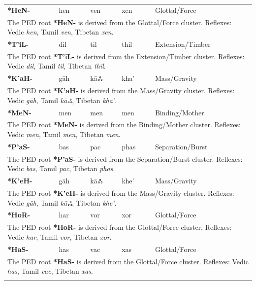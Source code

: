 \begin{longtable}{p{} p{} p{} p{} p{}}
\textbf{*HeN-} & hen & ven & xen & Glottal/Force \\ 
\multicolumn{5}{p{\textwidth}}{\small The PED root \textbf{*HeN-} is derived from the Glottal/Force cluster. Reflexes: Vedic \textit{hen}, Tamil \textit{ven}, Tibetan \textit{xen}. } \\ \addlinespace 
\textbf{*T'iL-} & dil & til & thil & Extension/Timber \\ 
\multicolumn{5}{p{\textwidth}}{\small The PED root \textbf{*T'iL-} is derived from the Extension/Timber cluster. Reflexes: Vedic \textit{dil}, Tamil \textit{til}, Tibetan \textit{thil}. } \\ \addlinespace 
\textbf{*K'aH-} & gāh & kāஃ & kha' & Mass/Gravity \\ 
\multicolumn{5}{p{\textwidth}}{\small The PED root \textbf{*K'aH-} is derived from the Mass/Gravity cluster. Reflexes: Vedic \textit{gāh}, Tamil \textit{kāஃ}, Tibetan \textit{kha'}. } \\ \addlinespace 
\textbf{*MeN-} & men & men & men & Binding/Mother \\ 
\multicolumn{5}{p{\textwidth}}{\small The PED root \textbf{*MeN-} is derived from the Binding/Mother cluster. Reflexes: Vedic \textit{men}, Tamil \textit{men}, Tibetan \textit{men}. } \\ \addlinespace 
\textbf{*P'aS-} & bas & pac & phas & Separation/Burst \\ 
\multicolumn{5}{p{\textwidth}}{\small The PED root \textbf{*P'aS-} is derived from the Separation/Burst cluster. Reflexes: Vedic \textit{bas}, Tamil \textit{pac}, Tibetan \textit{phas}. } \\ \addlinespace 
\textbf{*K'eH-} & gāh & kāஃ & khe' & Mass/Gravity \\ 
\multicolumn{5}{p{\textwidth}}{\small The PED root \textbf{*K'eH-} is derived from the Mass/Gravity cluster. Reflexes: Vedic \textit{gāh}, Tamil \textit{kāஃ}, Tibetan \textit{khe'}. } \\ \addlinespace 
\textbf{*HoR-} & har & vor & xor & Glottal/Force \\ 
\multicolumn{5}{p{\textwidth}}{\small The PED root \textbf{*HoR-} is derived from the Glottal/Force cluster. Reflexes: Vedic \textit{har}, Tamil \textit{vor}, Tibetan \textit{xor}. } \\ \addlinespace 
\textbf{*HaS-} & has & vac & xas & Glottal/Force \\ 
\multicolumn{5}{p{\textwidth}}{\small The PED root \textbf{*HaS-} is derived from the Glottal/Force cluster. Reflexes: Vedic \textit{has}, Tamil \textit{vac}, Tibetan \textit{xas}. } \\ \addlinespace 

\end{longtable}
